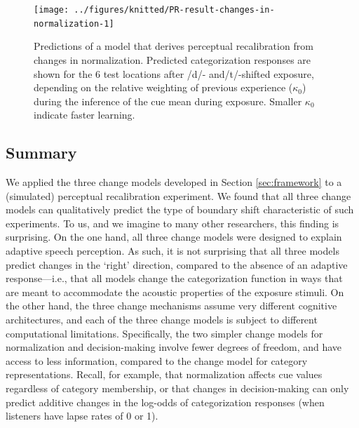 \documentclass[
  11pt,
  man,floatsintext]{apa6}
\begin{document}
\begin{figure}

{\centering \texttt{[image: ../figures/knitted/PR-result-changes-in-normalization-1]} 

}

\caption{Predictions of a model that derives perceptual recalibration from changes in normalization. Predicted categorization responses are shown for the 6 test locations after /d/- and/t/-shifted exposure, depending on the relative weighting of previous experience (\(\kappa_0\)) during the inference of the cue mean during exposure. Smaller \(\kappa_0\) indicate faster learning.}\label{fig:PR-result-changes-in-normalization}
\end{figure}

\subsection{Summary}\label{summary}

We applied the three change models developed in Section \ref{sec:framework} to a (simulated) perceptual recalibration experiment. We found that all three change models can qualitatively predict the type of boundary shift characteristic of such experiments. To us, and we imagine to many other researchers, this finding is surprising. On the one hand, all three change models were designed to explain adaptive speech perception. As such, it is not surprising that all three models predict changes in the `right' direction, compared to the absence of an adaptive response---i.e., that all models change the categorization function in ways that are meant to accommodate the acoustic properties of the exposure stimuli. On the other hand, the three change mechanisms assume very different cognitive architectures, and each of the three change models is subject to different computational limitations. Specifically, the two simpler change models for normalization and decision-making involve fewer degrees of freedom, and have access to less information, compared to the change model for category representations. Recall, for example, that normalization affects cue values regardless of category membership, or that changes in decision-making can only predict additive changes in the log-odds of categorization responses (when listeners have lapse rates of 0 or 1).
\end{document}
